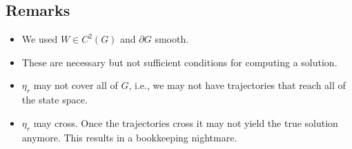 \subsection{Remarks}
\begin{itemize}
\item We used $W\in C^2(G)$ and $\partial G$ smooth.
\item These are necessary but not sufficient conditions for computing a solution.
\item $\eta_r$ may not cover all of $G$, i.e., we may not have trajectories that reach all of the state space.
\item $\eta_r$ may cross. Once the trajectories cross it may not yield the true solution anymore. This results in a bookkeeping nightmare.
\end{itemize}

